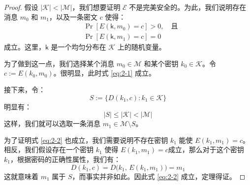 \begin{proof}
假设 $|\mathcal{K}|<|\mathcal{M}|$，我们想要证明 $\mathcal{E}$ 不是完美安全的。为此，我们说明存在消息 $m_0$ 和 $m_1$，以及一条密文 $c$ 使得：
\begin{align}
& \Pr[E(\boldsymbol{\mathsf{k}},m_0)=c]>0,\quad\text{且} \label{eq:2-1}\\
& \Pr[E(\boldsymbol{\mathsf{k}},m_1)=c]=0 \label{eq:2-2}
\end{align}
成立。这里，$\boldsymbol{\mathsf{k}}$ 是一个均匀分布在 $\mathcal{K}$ 上的随机变量。

为了做到这一点，我们选择某个消息 $m_0\in\mathcal{M}$ 和某个密钥 $k_0\in\mathcal{K}$。令 $c:=E(k_0,m_0)$。很明显，此时式 \ref{eq:2-1} 成立。

接下来，令：
\[
S:=\{D(k_1,c):k_1\in\mathcal{K}\}
\]
明显有：
\[
|S|\leq|\mathcal{K}|<|\mathcal{M}|
\]
这样，我们就可以选取一条消息 $m_1\in \mathcal{M}\setminus S$。

为了证明式 \ref{eq:2-2} 也成立，我们需要说明不存在密钥 $k_1$ 能使 $E(k_1,m_1) = c$。相反，我们假设存在一个密钥 $k_1$ 使得 $E(k_1,m_1) = c$成立，那么对于这个密钥 $k_1$，根据密码的正确性属性，我们有：
\[
D(k_1,c)=D\big(k_1,\,E(k_1,m_1)\big)=m_1
\]
这就意味着 $m_1$ 属于 $S$，而事实并非如此。因此式 \ref{eq:2-2} 成立，定理得证。
\end{proof}